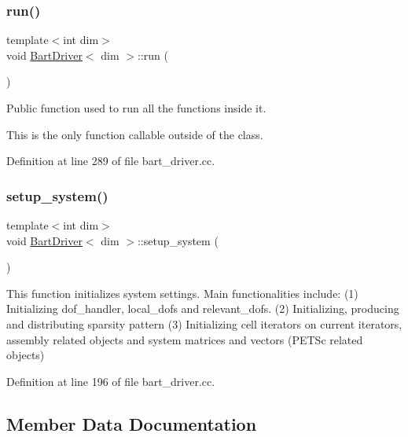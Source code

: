 \mbox{\label{class_bart_driver_a20c70ef3733fc4406353e6fdfee6c684}} 
\subsubsection{\texorpdfstring{run()}{run()}}
{\footnotesize\ttfamily template$<$int dim$>$ \\
void \hyperlink{class_bart_driver}{Bart\+Driver}$<$ dim $>$\+::run (\begin{DoxyParamCaption}{ }\end{DoxyParamCaption})}



Public function used to run all the functions inside it. 

This is the only function callable outside of the class. 

Definition at line 289 of file bart\+\_\+driver.\+cc.

\mbox{\label{class_bart_driver_a54ac94a562fa8f5cdb13ba6c56965b9c}} 
\subsubsection{\texorpdfstring{setup\+\_\+system()}{setup\_system()}}
{\footnotesize\ttfamily template$<$int dim$>$ \\
void \hyperlink{class_bart_driver}{Bart\+Driver}$<$ dim $>$\+::setup\+\_\+system (\begin{DoxyParamCaption}{ }\end{DoxyParamCaption})\hspace{0.3cm}{\ttfamily [private]}}

This function initializes system settings. Main functionalities include\+: (1) Initializing dof\+\_\+handler, local\+\_\+dofs and relevant\+\_\+dofs. (2) Initializing, producing and distributing sparsity pattern (3) Initializing cell iterators on current iterators, assembly related objects and system matrices and vectors (P\+E\+T\+Sc related objects) 

Definition at line 196 of file bart\+\_\+driver.\+cc.



\subsection{Member Data Documentation}
\mbox{\label{class_bart_driver_a818149e4acfe5a7108ef42938650ff11}} 

